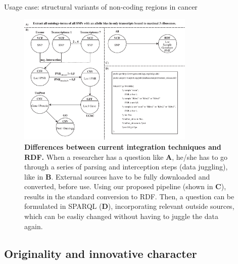 \documentclass[twoside,fontsize=10pt]{article}
\begin{document}
\noindent
Usage case: structural variants of non-coding regions in cancer



\begin{figure}[H]
    \centering
    \includegraphics[width=0.75\textwidth]{DifferencesInDoingThings}
    \caption{\textbf{Differences between current integration techniques and RDF.} When a researcher has a question like \textbf{A}, he/she has to go through a series of parsing and interception steps (data juggling), like in \textbf{B}. External sources have to be fully downloaded and converted, before use. Using our proposed pipeline (shown in \textbf{C}), results in the standard conversion to RDF. Then, a question can be formulated in SPARQL (\textbf{D}), incorporating relevant outside sources, which can be easliy changed without having to juggle the data again.}
    \label{fig:awesome_image}
\end{figure}
\subsection*{Originality and innovative character} 
\end{document}
